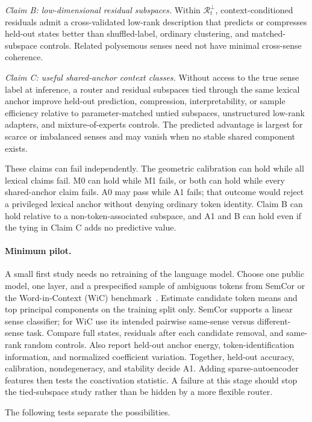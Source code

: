 \documentclass[
  aps,
  reprint,
  superscriptaddress,
  floatfix,
  nofootinbib,
  longbibliography
]{revtex4-2}
\begin{document}
\emph{Claim B: low-dimensional residual subspaces.}
Within $\mathcal R_t^\perp$, context-conditioned residuals admit a cross-validated
low-rank description that predicts or compresses held-out states better than
shuffled-label, ordinary clustering, and matched-subspace controls.  Related
polysemous senses need not have minimal cross-sense coherence.

\emph{Claim C: useful shared-anchor context classes.}
Without access to the true sense label at inference, a router and residual
subspaces tied through the same lexical anchor improve held-out prediction,
compression, interpretability, or sample efficiency relative to
parameter-matched untied subspaces, unstructured low-rank adapters, and
mixture-of-experts controls.  The predicted advantage is largest for scarce or
imbalanced senses and may vanish when no stable shared component exists.

These claims can fail independently.  The geometric calibration can hold while
all lexical claims fail.  M0 can hold while M1 fails, or both can hold while
every shared-anchor claim fails.  A0 may pass while A1 fails; that outcome
would reject a privileged lexical anchor without denying ordinary token
identity.  Claim B can hold relative to a non-token-associated subspace, and
A1 and B can hold even if the tying in Claim C adds no predictive value.

\paragraph{Minimum pilot.}
A small first study needs no retraining of the language model.  Choose one
public model, one
layer, and a prespecified sample of ambiguous tokens from SemCor or the
Word-in-Context (WiC) benchmark~\cite{pilehvar2019wic}.  Estimate candidate token
means and top principal components on the training split only.  SemCor supports
a linear sense classifier; for WiC use its intended pairwise same-sense versus
different-sense task.  Compare full states, residuals after each candidate
removal, and same-rank random controls.  Also report held-out anchor energy,
token-identification information, and normalized coefficient variation.
Together, held-out accuracy, calibration, nondegeneracy, and stability decide
A1.
Adding sparse-autoencoder features then tests the coactivation statistic.  A
failure at this stage should stop the tied-subspace study rather than be
hidden by a more flexible router.

The following tests separate the possibilities.
\end{document}
